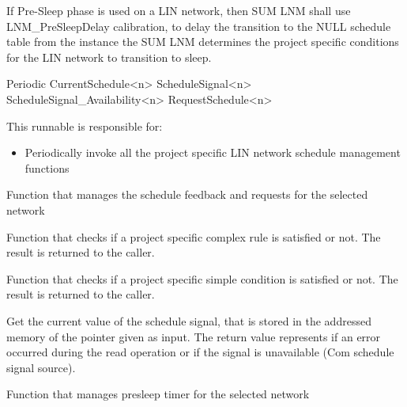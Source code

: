 {
If Pre-Sleep phase is used on a LIN network, then SUM LNM shall use LNM_PreSleepDelay calibration, to delay the transition to the NULL schedule table from the instance the SUM LNM determines the project specific conditions for the LIN network to transition to sleep.}
{}

{Periodic}
{}
{CurrentSchedule<n> \newline
ScheduleSignal<n> \newline
ScheduleSignal_Availability<n>}
{RequestSchedule<n>}
{}
{}
{This runnable is responsible for:
\begin{itemize}
\item Periodically invoke all the project specific LIN network schedule management functions
\end{itemize}
}

{}
{}
{}
{}
{Function that manages the schedule feedback and requests for the selected network}

{}
{}
{}
{}
{Function that checks if a project specific complex rule is satisfied or not. The result is returned to the caller.}

{}
{}
{}
{}
{Function that checks if a project specific simple condition is satisfied or not. The result is returned to the caller.}

{}
{}
{}
{}
{Get the current value of the schedule signal, that is stored in the addressed memory of the pointer given as input. The return value represents if an error occurred during the read operation or if the
signal is unavailable (Com schedule signal source).}

{}
{}
{}
{}
{Function that manages presleep timer for the selected network}

